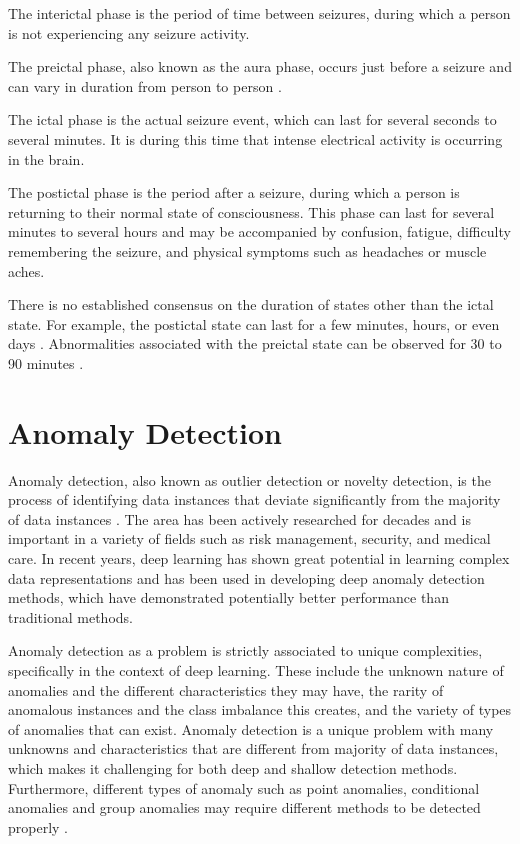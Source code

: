 The interictal phase is the period of time between seizures, during which a person is not experiencing any seizure activity. 

The preictal phase, also known as the aura phase, occurs just before a seizure and can vary in duration from person to person \cite{scaramelli_prodromal_2009}. 

The ictal phase is the actual seizure event, which can last for several seconds to several minutes. It is during this time that intense electrical activity is occurring in the brain. 

The postictal phase is the period after a seizure, during which a person is returning to their normal state of consciousness. This phase can last for several minutes to several hours and may be accompanied by confusion, fatigue, difficulty remembering the seizure, and physical symptoms such as headaches or muscle aches.

There is no established consensus on the duration of states other than the ictal state. 
For example, the postictal state can last for a few minutes, hours, or even days \cite{remi_clinical_2010}. Abnormalities associated with the preictal state can be observed for 30 to 90 minutes \cite{richardson_introductionepilepsy_2011}.

\section{Anomaly Detection}
Anomaly detection, also known as outlier detection or novelty detection, is the process of identifying data instances that deviate significantly from the majority of data instances \cite{pang_deep_2021}. The area has been actively researched for decades and is important in a variety of fields such as risk management, security, and medical care. In recent years, deep learning has shown great potential in learning complex data representations and has been used in developing deep anomaly detection methods, which have demonstrated potentially better performance than traditional methods.

Anomaly detection as a problem is strictly associated to unique complexities, specifically in the context of deep learning. These include the unknown nature of anomalies and the different characteristics they may have, the rarity of anomalous instances and the class imbalance this creates, and the variety of types of anomalies that can exist. Anomaly detection is a unique problem with many unknowns and characteristics that are different from majority of data instances, which makes it challenging for both deep and shallow detection methods. Furthermore, different types of anomaly such as point anomalies, conditional anomalies and group anomalies may require different methods to be detected properly \cite{chandola_anomaly_2009}.

